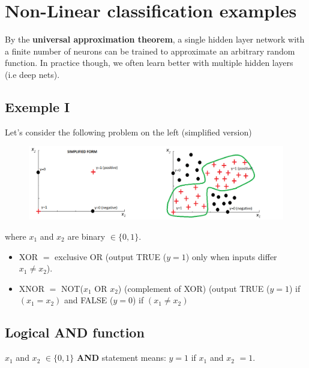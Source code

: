 \documentclass[a4paper,12pt]{report}
\begin{document}
\section{Non-Linear classification examples }
By the \textbf{universal approximation theorem}, a single hidden layer network with a finite number of neurons can be trained to approximate an arbitrary random function. In practice though, we often learn better with multiple hidden layers (i.e deep nets). 
\subsection{Exemple I}
Let's consider the following problem on the left (simplified version)
\begin{figure}[H]
\centering
        \includegraphics[totalheight=4 cm]{example1.png}
\end{figure}
where $x_1$ and $x_2$ are binary $\in \{0,1\}$.
\begin{itemize}
\item XOR $=$ exclusive OR (output TRUE ($y=1$) only when inputs differ $x_1 \neq x_2$).
\item XNOR $=$ NOT($x_1$ OR $x_2$) (complement of XOR) (output TRUE ($y=1$) if $(x_1 = x_2)$ and FALSE ($y=0$) if $(x_1 \neq x_2)$
\end{itemize}
\subsection{Logical AND function}
$x_1$ and $x_2$ $\in \{0,1\}$
\textbf{AND} statement means: $y =1$ if $x_1$ and $x_2$ $= 1$.
\end{document}

